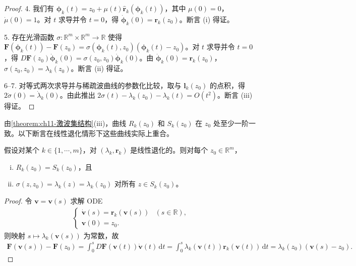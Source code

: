 \documentclass[../../main.tex]{subfiles}
\begin{document}
\begin{proof}
4. 我们有 $\boldsymbol{\phi}_k(t)=z_0+\mu(t)\widehat{\mathbf{r}}_k(\boldsymbol{\phi}_k(t))$，其中 $\mu(0)=0$，$\dot{\mu}(0)=1$。对 $t$ 求导并令 $t=0$，得 $\dot{\boldsymbol{\phi}}_k(0)=\mathbf{r}_k(z_0)$。断言 (i) 得证。

5. 存在光滑函数 $\sigma:\mathbb{R}^m\times\mathbb{R}^m\to\mathbb{R}$ 使得 $\mathbf{F}(\boldsymbol{\phi}_k(t))-\mathbf{F}(z_0)=\sigma(\boldsymbol{\phi}_k(t),z_0)(\boldsymbol{\phi}_k(t)-z_0)$。对 $t$ 求导并令 $t=0$，得 $D\mathbf{F}(z_0)\dot{\boldsymbol{\phi}}_k(0)=\sigma(z_0,z_0)\dot{\boldsymbol{\phi}}_k(0)$。由 $\dot{\boldsymbol{\phi}}_k(0)=\mathbf{r}_k(z_0)$，$\sigma(z_0,z_0)=\lambda_k(z_0)$。断言 (ii) 得证。

6--7. 对等式两次求导并与稀疏波曲线的参数化比较，取与 $\mathbf{l}_k(z_0)$ 的点积，得 $2\dot{\sigma}(0)=\dot{\lambda}_k(0)$。由此推出 $2\sigma(t)-\lambda_k(z_0)-\lambda_k(t)=O(t^2)$。断言 (iii) 得证。
\end{proof}

由\cref{theorem:ch11-激波集结构}(iii)，曲线 $R_k(z_0)$ 和 $S_k(z_0)$ 在 $z_0$ 处至少一阶一致。以下断言在线性退化情形下这些曲线实际上重合。

\begin{theorem}[线性退化。]\label{theorem:ch11-线性退化}假设对某个 $k\in\{1,\cdots,m\}$，对 $(\lambda_k,\mathbf{r}_k)$ 是线性退化的。则对每个 $z_0\in\mathbb{R}^m$，
\begin{enumerate}[(i)]
\item $R_k(z_0)=S_k(z_0)$，且
\item $\sigma(z,z_0)=\lambda_k(z)=\lambda_k(z_0)$ 对所有 $z\in S_k(z_0)$。
\end{enumerate}
\end{theorem}

\begin{proof}
令 $\mathbf{v}=\mathbf{v}(s)$ 求解 ODE
\begin{align*}
\begin{cases}
\dot{\mathbf{v}}(s)=\mathbf{r}_k(\mathbf{v}(s)) & (s\in\mathbb{R}),\\
\mathbf{v}(0)=z_0.
\end{cases}
\end{align*}
则映射 $s\mapsto\lambda_k(\mathbf{v}(s))$ 为常数，故
\begin{align*}
\mathbf{F}(\mathbf{v}(s))-\mathbf{F}(z_0)=\int_0^s D\mathbf{F}(\mathbf{v}(t))\dot{\mathbf{v}}(t)\,\mathrm{d}t=\int_0^s \lambda_k(\mathbf{v}(t))\mathbf{r}_k(\mathbf{v}(t))\,\mathrm{d}t=\lambda_k(z_0)(\mathbf{v}(s)-z_0).
\end{align*}
\end{proof}
\end{document}
